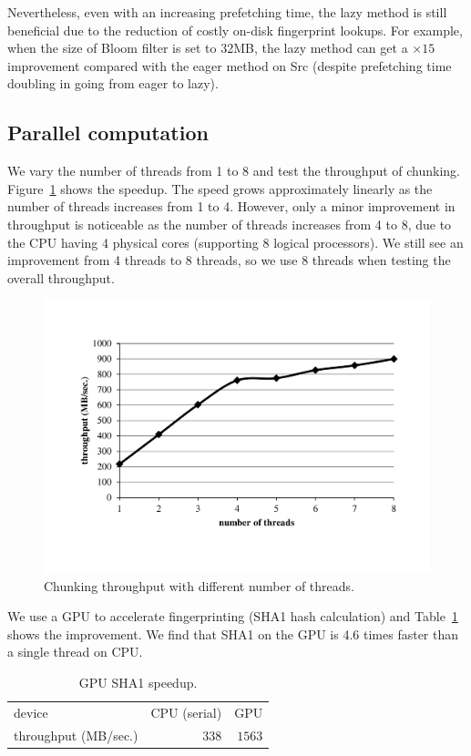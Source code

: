 \documentclass[prodmode,acmtecs]{acmsmall}
\begin{document}
Nevertheless, even with an increasing prefetching time, the lazy method is still beneficial due to the reduction of costly on-disk fingerprint lookups. For example, when the size of Bloom filter is set to 32MB, the lazy method can get a $\times 15$ improvement compared with the eager method on Src (despite prefetching time doubling in going from eager to lazy).


\subsection{Parallel computation}

We vary the number of threads from 1 to 8 and test the throughput of chunking. Figure~\ref{fig:chunk-speed} shows the speedup. The speed grows approximately linearly as the number of threads increases from 1 to 4. However, only a minor improvement in throughput is noticeable as the number of threads increases from 4 to 8, due to the CPU having 4 physical cores (supporting 8 logical processors). We still see an improvement from 4 threads to 8 threads, so we use 8 threads when testing the overall throughput.

\begin{figure}[htp]
\centering

\includegraphics[width=0.8\columnwidth]{chunk-speed}

\caption{Chunking throughput with different number of threads.}
\label{fig:chunk-speed}
\end{figure}

We use a GPU to accelerate fingerprinting (SHA1 hash calculation) and Table~\ref{tab:gpu} shows the improvement. We find that SHA1 on the GPU is 4.6 times faster than a single thread on CPU.

\begin{table}[htp]
\centering
\begin{tabular}{lrr}
\toprule
device & CPU (serial) & GPU \\
\cmidrule(lr){1-1} \cmidrule(lr){2-2} \cmidrule(lr){3-3}
throughput (MB/sec.) & $338$ & $1563$ \\
\bottomrule
\end{tabular}
\caption{GPU SHA1 speedup.}
\label{tab:gpu}
\end{table}
\end{document}
